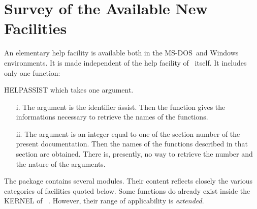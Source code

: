 \section{ Survey of the Available New Facilities}
An elementary help facility is available both in
the MS-DOS\ and Windows environments. It is made independent of the
help facility of \REDUCE\ itself. It includes only one function:

\f{HELPASSIST} which takes one argument.
\begin{itemize}
\item[i.] The argument is the identifier \f{assist}. Then the function
gives the informations necessary to retrieve the names of the functions.
\item[ii.] The argument is an integer equal to one of the section number
of the present documentation. Then the names of the functions described
in that section are obtained.\nl
There is, presently, no way to retrieve the number and the nature of the
arguments.
\end{itemize}
The package contains several modules. Their content reflects closely
the various categories of facilities quoted below. Some functions do
already exist inside the KERNEL of \REDUCE\ . However, their range
of applicability is {\em extended}.\nl
